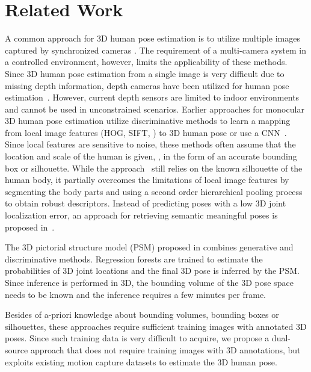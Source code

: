 \documentclass[10pt,twocolumn,letterpaper]{article}
\begin{document}
\section{Related Work}
A common approach for 3D human pose estimation is to utilize multiple images captured by synchronized cameras \cite{belagiannis20143d, sigal2012loose, yao2012coupled}.
The requirement of a multi-camera system in a controlled environment, however, limits the applicability of these methods. Since 3D human pose estimation from a single image is very difficult due to missing depth information, depth cameras have been utilized for human pose estimation~\cite{Baak:2011,Shotton:2011,Grest:2005}.
However, current depth sensors are limited to indoor environments and cannot be used in unconstrained scenarios.
Earlier approaches for monocular 3D human pose estimation \cite{Bo-2010, AgarwalT-2004,Sminchisescu-2005,Agarwal:2006, bo2008fast, mori2006recovering} utilize discriminative methods to learn a mapping from local image features (\eg HOG, SIFT, \etc ) to 3D human pose or use a CNN~\cite{LiC14, Sijin2015iccv}. Since local features are sensitive to noise, these methods often assume that the location and scale of the human is given, \eg, in the form of an accurate bounding box or silhouette.
While the approach~\cite{ics-cvpr14} still relies on the known silhouette of the human body, it partially overcomes the limitations of local image features by segmenting the body parts and using a second order hierarchical pooling process to obtain robust descriptors. Instead of predicting poses with a low 3D joint localization error, an approach for retrieving semantic meaningful poses is proposed in~\cite{Pons-Moll_2014_CVPR}.  

The 3D pictorial structure model (PSM) proposed in \cite{Ilya_2014} combines generative and discriminative methods. Regression forests are trained to estimate the probabilities of 3D joint locations and the final 3D pose is inferred by the PSM. Since inference is performed in 3D, the bounding volume of the 3D pose space needs to be known and the inference requires a few minutes per frame.

Besides of a-priori knowledge about bounding volumes, bounding boxes or silhouettes, these approaches require sufficient training images with annotated 3D poses. Since such training data is very difficult to acquire, we propose a dual-source approach that does not require training images with 3D annotations, but exploits existing motion capture datasets to estimate the 3D human pose.
\end{document}
